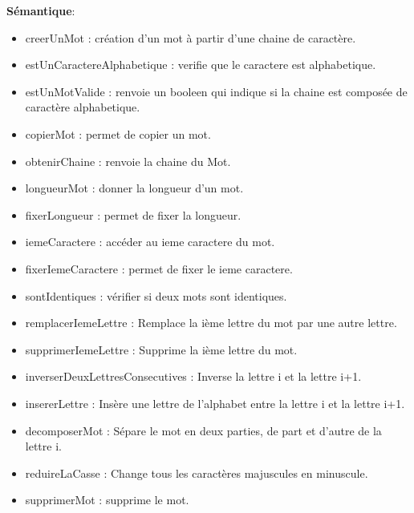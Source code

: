     \textbf{Sémantique}: \begin{itemize}[label=$\- $, leftmargin=2cm, itemsep=0cm]
      	\item creerUnMot : création d’un mot à partir d’une chaine de caractère.
      	\item estUnCaractereAlphabetique : verifie que le caractere est alphabetique.
      	\item estUnMotValide : renvoie un booleen qui indique si la chaine est composée de caractère alphabetique.
      	\item copierMot : permet de copier un mot.
      	\item obtenirChaine : renvoie la chaine du Mot.
        \item longueurMot : donner la longueur d’un mot.
        \item fixerLongueur : permet de fixer la longueur.
        \item iemeCaractere : accéder au ieme caractere du mot.
        \item fixerIemeCaractere : permet de fixer le ieme caractere.
        \item sontIdentiques : vérifier si deux mots sont identiques.
        \item remplacerIemeLettre : Remplace la ième lettre du mot par une autre lettre.
        \item supprimerIemeLettre : Supprime la ième lettre du mot.
        \item inverserDeuxLettresConsecutives : Inverse la lettre i et la lettre i+1.
        \item insererLettre : Insère une lettre de l'alphabet entre la lettre i et la lettre i+1.
        \item decomposerMot : Sépare le mot en deux parties, de part et d'autre de la lettre i.
        \item reduireLaCasse : Change tous les caractères majuscules en minuscule.
        \item supprimerMot : supprime le mot.
    \end{itemize}

